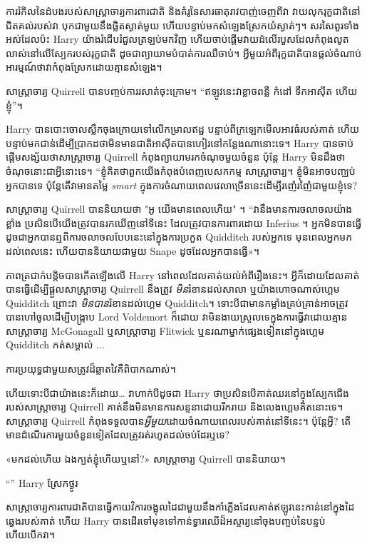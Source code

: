 ការរំកិលនៃដំបងរបស់សាស្ត្រាចារ្យការពារជាតិ និងគំរូនៃសារធាតុរាវបាញ់ចេញពីវា វាយលុករុក្ខជាតិនៅជិតគល់របស់វា បុកជាមួយនឹងផ្លិតស្ងាត់មួយ ហើយបន្ទាប់មកសំឡេងស្រែកយំស្ងាត់ៗ។ សរសៃពួរទាំងអស់ដែលប៉ះ Harry យ៉ាងរំជើបរំជួលត្រឡប់មកវិញ ហើយចាប់ផ្តើមវាយដំលើរបួសដែលកំពុងលូតលាស់នៅលើស្បែករបស់រុក្ខជាតិ ដូចជាព្យាយាមបំបាត់ការឈឺចាប់។ អ្វីមួយអំពីរុក្ខជាតិបានផ្តល់ចំណាប់អារម្មណ៍ថាវាកំពុងស្រែកដោយគ្មានសំឡេង។

សាស្រ្តាចារ្យ Quirrell បានបញ្ចប់ការរសាត់ចុះក្រោម។ “ឥឡូវ​នេះ​វា​ខ្លាច​ពន្លឺ កំដៅ ទឹក​អាស៊ីត ហើយ​ខ្ញុំ”។

Harry បានបោះចោលស្លឹកចុងក្រោយទៅលើកម្រាលឥដ្ឋ បន្ទាប់ពីក្រឡេកមើលអាវធំរបស់គាត់ ហើយបន្ទាប់មកជាន់ដើម្បីប្រាកដថាមិនមានជាតិអាស៊ីតបានហៀរនៅកន្លែងណានោះទេ។ Harry បានចាប់ផ្តើមសង្ស័យថាសាស្រ្តាចារ្យ Quirrell កំពុងព្យាយាមរកចំណុចមួយចំនួន ប៉ុន្តែ Harry មិនដឹងថាចំណុចនោះជាអ្វីនោះទេ។ “ខ្ញុំគិតថាពួកយើងកំពុងបំពេញបេសកកម្ម សាស្រ្តាចារ្យ។ ខ្ញុំមិនអាចបញ្ឈប់អ្នកបានទេ ប៉ុន្តែតើវាមានតម្លៃ \emph{smart} ក្នុងការចំណាយពេលវេលាច្រើននេះដើម្បីរញ៉េរញ៉ៃជាមួយខ្ញុំទេ?

សាស្រ្តាចារ្យ Quirrell បាននិយាយថា "អូ យើងមានពេលហើយ" ។ “វានឹងមានការចលាចលយ៉ាងខ្លាំង ប្រសិនបើយើងត្រូវបានរកឃើញនៅទីនេះ ដែលត្រូវបានការពារដោយ Inferius ។ អ្នក​មិន​បាន​ធ្វើ​ដូច​ជា​អ្នក​បាន​ឮ​ពី​ការ​ចលាចល​បែប​នេះ​នៅ​ក្នុង​ការ​ប្រកួត Quidditch របស់​អ្នក​ទេ មុន​ពេល​អ្នក​មក​ដល់​ពេល​នេះ ហើយ​បាន​និយាយ​ជាមួយ Snape ដូច​ដែល​អ្នក​បាន​ធ្វើ»។

ភាព​ត្រជាក់​បន្តិច​បាន​កើត​ឡើង​លើ Harry នៅ​ពេល​ដែល​គាត់​យល់​អំពី​រឿង​នេះ។ អ្វីក៏ដោយដែលគាត់បានធ្វើដើម្បីផ្តួលសាស្រ្តាចារ្យ Quirrell នឹងត្រូវ \emph{មិន}រំខានដល់សាលា ឬយ៉ាងហោចណាស់ហ្គេម Quidditch ព្រោះវា \emph{មិនបាន}រំខានដល់ហ្គេម Quidditch។ ទោះបីជាមានកម្លាំងគ្រប់គ្រាន់អាចត្រូវបានហៅចូលដើម្បីបង្ក្រាប Lord Voldemort ក៏ដោយ វាមិនងាយស្រួលទេក្នុងការធ្វើវាដោយគ្មានសាស្រ្តាចារ្យ McGonagall ឬសាស្រ្តាចារ្យ Flitwick ឬនរណាម្នាក់ផ្សេងទៀតនៅក្នុងហ្គេម Quidditch កត់សម្គាល់ ...

ការប្រយុទ្ធជាមួយសត្រូវដ៏ឆ្លាតវៃគឺពិបាកណាស់។

ហើយទោះបីជាយ៉ាងនេះក៏ដោយ… វាហាក់បីដូចជា Harry ថាប្រសិនបើគាត់ឈរនៅក្នុងស្បែកជើងរបស់សាស្រ្តាចារ្យ Quirrell គាត់នឹងមិនមានការសន្ទនាដោយរីករាយ និងលេងហ្គេមគិតនោះទេ។ សាស្រ្តាចារ្យ Quirrell កំពុងទទួលបាន\emph{អ្វីមួយ}ដោយចំណាយពេលរបស់គាត់នៅទីនេះ។ ប៉ុន្តែអ្វី? តើ​មាន​ដំណើរ​ការ​មួយ​ចំនួន​ទៀត​ដែល​ត្រូវ​រត់​រហូត​ដល់​ចប់​ដែរ​ឬ​ទេ?

«មកដល់ហើយ ឯងក្បត់ខ្ញុំហើយឬនៅ?» សាស្ត្រាចារ្យ Quirrell បាននិយាយ។

“” Harry ស្រែកថ្ងូរ

សាស្ត្រាចារ្យការពារជាតិបានធ្វើកាយវិការចង្អុលដៃជាមួយនឹងកាំភ្លើងដែលគាត់ឥឡូវនេះកាន់នៅក្នុងដៃឆ្វេងរបស់គាត់ ហើយ Harry បានដើរទៅមុខទៅកាន់ទ្វារឈើដ៏អស្ចារ្យនៅចុងបញ្ចប់នៃបន្ទប់ ហើយបើកវា។

